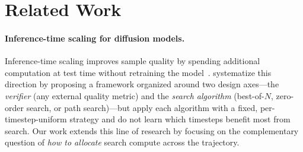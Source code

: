 \section{Related Work}
\label{sec:related}

\paragraph{Inference-time scaling for diffusion models.}
Inference-time scaling improves sample quality by spending additional
computation at test time without retraining the
model~\citep{ma2024inference,ramesh2025nts}.
\citet{ma2024inference} systematize this direction by proposing a framework
organized around two design axes---the \emph{verifier} (any external quality
metric) and the \emph{search algorithm} (best-of-$N$, zero-order search, or
path search)---but apply each algorithm with a fixed, per-timestep-uniform
strategy and do not learn which timesteps benefit most from search.
Our work extends this line of research by focusing on the complementary
question of \emph{how to allocate} search compute across the trajectory.

